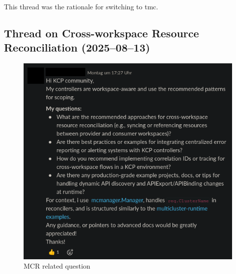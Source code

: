 \documentclass[11pt, a4paper, oneside, listof=totoc]{scrartcl}
\begin{document}
                This thread was the rationale for switching to \gls{tmc}.

            \FloatBarrier
            \subsection{Thread on Cross-workspace Resource Reconciliation (2025--08--13)}
                \begin{figure}[h!]
                    \centering
                    \includegraphics[width=\textwidth]{screenshots/slack/mcr-question.anonymized.png}
                    \caption{MCR related question}\label{fig:mcr-question}
                \end{figure}
\end{document}
